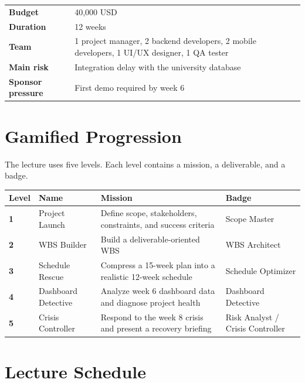 \documentclass[11pt,a4paper]{article}
\begin{document}
\begin{tabular}{>{\bfseries}p{4cm}p{10.5cm}}
Budget & 40,000 USD \\
Duration & 12 weeks \\
Team & 1 project manager, 2 backend developers, 2 mobile developers, 1 UI/UX designer, 1 QA tester \\
Main risk & Integration delay with the university database \\
Sponsor pressure & First demo required by week 6 \\
\end{tabular}

\section*{Gamified Progression}

The lecture uses five levels. Each level contains a mission, a deliverable, and a badge.

\begin{longtable}{>{\bfseries}p{1.6cm}p{3.2cm}p{5.2cm}p{3.4cm}}
\textbf{Level} & \textbf{Name} & \textbf{Mission} & \textbf{Badge} \\
\hline
1 & Project Launch & Define scope, stakeholders, constraints, and success criteria & Scope Master \\
2 & WBS Builder & Build a deliverable-oriented WBS & WBS Architect \\
3 & Schedule Rescue & Compress a 15-week plan into a realistic 12-week schedule & Schedule Optimizer \\
4 & Dashboard Detective & Analyze week 6 dashboard data and diagnose project health & Dashboard Detective \\
5 & Crisis Controller & Respond to the week 8 crisis and present a recovery briefing & Risk Analyst / Crisis Controller \\
\end{longtable}

\section*{Lecture Schedule}
\end{document}
